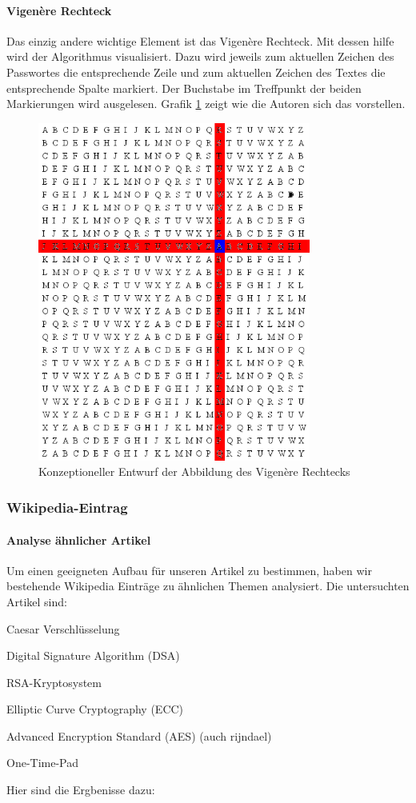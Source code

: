 \documentclass[11pt,paper=a4,final]{scrartcl}
\begin{document}
\paragraph{Vigen\`ere Rechteck}
Das einzig andere wichtige Element ist das Vigen\`ere Rechteck. Mit dessen hilfe
wird der Algorithmus visualisiert. Dazu wird jeweils zum aktuellen Zeichen des
Passwortes die entsprechende Zeile und zum aktuellen Zeichen des Textes die
entsprechende Spalte markiert. Der Buchstabe im Treffpunkt der beiden
Markierungen wird ausgelesen. Grafik \ref{fig:select} \glqq {}
\grqq zeigt wie die Autoren sich das vorstellen.
\begin{figure}[h!]
  \centering
  \includegraphics[width=0.8\textwidth]{select.png}
  \caption{Konzeptioneller Entwurf der Abbildung des Vigen\`ere Rechtecks}
  \label{fig:select}
\end{figure}


\subsubsection{Wikipedia-Eintrag}
\paragraph{Analyse \"ahnlicher Artikel}
Um einen geeigneten Aufbau f\"ur unseren Artikel zu bestimmen, haben wir
bestehende Wikipedia Eintr\"age zu \"ahnlichen Themen analysiert. Die
untersuchten Artikel sind:
\begin{itemize*}
  \item Caesar Verschl\"usselung
  \item Digital Signature Algorithm (DSA)
  \item RSA-Kryptosystem 
  \item Elliptic Curve Cryptography (ECC)
  \item Advanced Encryption Standard (AES) (auch rijndael)
  \item One-Time-Pad
\end{itemize*}
Hier sind die Ergbenisse dazu:
\end{document}
